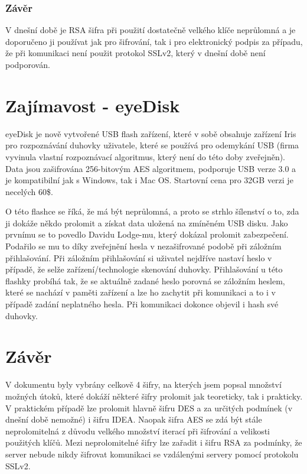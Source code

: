 \documentclass[12pt, a4paper]{article}
\begin{document}
		\subsubsection{Závěr}
		V dnešní době je RSA šifra při použití dostatečně velkého klíče neprůlomná a je doporučeno ji používat jak pro šifrování, tak i pro elektronický podpis za případu, že při komunikaci není použit protokol SSLv2, který v dnešní době není podporován.
\section{Zajímavost - eyeDisk}
eyeDisk je nově vytvořené USB flash zařízení, které v sobě obsahuje zařízení Iris pro rozpoznávání duhovky uživatele, které se používá pro odemykání USB (firma vyvinula vlastní rozpoznávací algoritmus, který není do této doby zveřejněn). Data jsou zašifrována 256-bitovým AES algoritmem, podporuje USB verze 3.0 a je kompatibilní jak s Windows, tak i Mac OS. Startovní cena pro 32GB verzi je necelých 60\$. 
\par
O této flashce se říká, že má být neprůlomná, a proto se strhlo šílenství o to, zda ji dokáže někdo prolomit a získat data uložená na zmíněném USB disku. Jako prvnímu se to povedlo Davidu Lodge-mu, který dokázal prolomit zabezpečení. Podařilo se mu to díky zveřejnění hesla v nezašifrované podobě při záložním přihlašování. Při záložním přihlašování si uživatel nejdříve nastaví heslo v případě, že selže zařízení/technologie skenování duhovky. Přihlašování u této flashky probíhá tak, že se aktuálně zadané heslo porovná se záložním heslem, které se nachází v paměti zařízení a lze ho zachytit při komunikaci a to i v případě zadání neplatného hesla. Při komunikaci dokonce objevil i hash své duhovky.
\section{Závěr}
V dokumentu byly vybrány celkově 4 šifry, na kterých jsem popsal množství možných útoků, které dokáží některé šifry prolomit jak teoreticky, tak i prakticky. V praktickém případě lze prolomit hlavně šifru DES a za určitých podmínek (v dnešní době nemožné) i šifru IDEA. Naopak šifra AES se zdá být stále neprolomitelná z důvodu velkého množství iterací při šifrování a velikosti použitých klíčů. Mezi neprolomitelné šifry lze zařadit i šifru RSA za podmínky, že server nebude nikdy šifrovat komunikaci se vzdálenými servery pomocí protokolu SSLv2.
\end{document}
